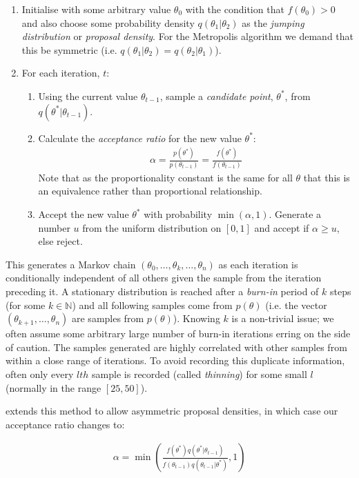 \documentclass[11pt]{article} %
\begin{document}
\begin{enumerate}
 \item Initialise with some arbitrary value $\theta_0$ with the condition that $f(\theta_0) > 0$ and also choose some probability density $q(\theta_1|\theta_2)$ as the \emph{jumping distribution} or \emph{proposal density}. For the Metropolis algorithm we demand that this be symmetric (i.e. $q(\theta_1 | \theta_2) = q(\theta_2 | \theta_1)$).
 \item For each iteration, $t$:
 \begin{enumerate}
   \item Using the current value $\theta_{t-1}$, sample a \emph{candidate point}, $\theta^*$, from  $q(\theta^* | \theta_{t-1})$.
   \item Calculate the \emph{acceptance ratio} for the new value $\theta^*$:
    \begin{align}
    \alpha = \frac{p(\theta^*)}{p(\theta_{t-1})} = \frac{f(\theta^*)}{f(\theta_{t-1})}
    \end{align}
    Note that as the proportionality constant is the same for all $\theta$ that this is an equivalence rather than proportional relationship.
    \item Accept the new value $\theta^*$ with probability $\min(\alpha, 1)$. Generate a number $u$ from the uniform distribution on $[0,1]$ and accept if $\alpha \geq u$, else reject.
  \end{enumerate}
\end{enumerate}
This generates a Markov chain $(\theta_0,\ldots,\theta_k,\ldots, \theta_n)$ as each iteration is conditionally independent of all others given the sample from the iteration preceding it. A stationary distribution is reached after a \emph{burn-in} period of $k$ steps (for some $k \in \mathbb{N}$) and all following samples come from $p(\theta)$ (i.e. the vector $(\theta_{k+1},\ldots,\theta_n)$ are samples from $p(\theta)$). Knowing $k$ is a non-trivial issue; we often assume some arbitrary large number of burn-in iterations erring on the side of caution. The samples generated are highly correlated with other samples from within a close range of iterations. To avoid recording this duplicate information, often only every $lth$ sample is recorded (called \emph{thinning}) for some small $l$ (normally in the range $[25, 50]$).

\citet{HastingsMonteCarloSampling} extends this method to allow asymmetric proposal densities, in which case our acceptance ratio changes to:

\begin{align} \label{metropolis_hastings_alpha}
\alpha = \min\left(\frac{f(\theta^*) q(\theta^*|\theta_{t-1})}{f(\theta_{t-1})q(\theta_{t-1}|\theta^*)}, 1\right)
\end{align}
\end{document}

